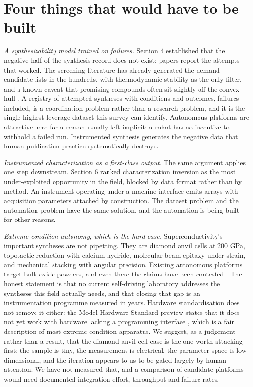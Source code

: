 \documentclass[
  11pt,
]{article}
\begin{document}
\section{Four things that would have to be
built}\label{four-things-that-would-have-to-be-built}

\emph{A synthesizability model trained on failures.} Section 4
established that the negative half of the synthesis record does not
exist: papers report the attempts that worked. The screening literature
has already generated the demand -- candidate lists in the hundreds,
with thermodynamic stability as the only filter, and a known caveat that
promising compounds often sit slightly off the convex hull
\citep{cerqueira2024searching}. A registry of attempted syntheses with
conditions and outcomes, failures included, is a coordination problem
rather than a research problem, and it is the single highest-leverage
dataset this survey can identify. Autonomous platforms are attractive
here for a reason usually left implicit: a robot has no incentive to
withhold a failed run. Instrumented synthesis generates the negative
data that human publication practice systematically destroys.

\emph{Instrumented characterization as a first-class output.} The same
argument applies one step downstream. Section 6 ranked characterization
inversion as the most under-exploited opportunity in the field, blocked
by data format rather than by method. An instrument operating under a
machine interface emits arrays with acquisition parameters attached by
construction. The dataset problem and the automation problem have the
same solution, and the automation is being built for other reasons.

\emph{Extreme-condition autonomy, which is the hard case.}
Superconductivity's important syntheses are not pipetting. They are
diamond anvil cells at 200 GPa, topotactic reduction with calcium
hydride, molecular-beam epitaxy under strain, and mechanical stacking
with angular precision. Existing autonomous platforms target bulk oxide
powders, and even there the claims have been contested
\citep{leeman2024challenges}. The honest statement is that no current
self-driving laboratory addresses the syntheses this field actually
needs, and that closing that gap is an instrumentation programme
measured in years. Hardware standardisation does not remove it either:
the Model Hardware Standard preview states that it does not yet work
with hardware lacking a programming interface \citep{anthropic2026mhs},
which is a fair description of most extreme-condition apparatus. We
suggest, as a judgement rather than a result, that the
diamond-anvil-cell case is the one worth attacking first: the sample is
tiny, the measurement is electrical, the parameter space is
low-dimensional, and the iteration appears to us to be gated largely by
human attention. We have not measured that, and a comparison of
candidate platforms would need documented integration effort, throughput
and failure rates.
\end{document}
